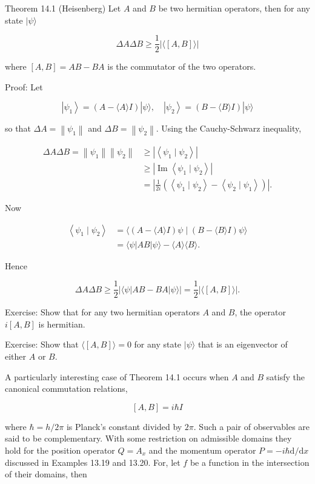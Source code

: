 \documentclass[10pt]{article}
\begin{document}
Theorem 14.1 (Heisenberg) Let $A$ and $B$ be two hermitian operators, then for any state $|\psi\rangle$

$$
\Delta A \Delta B \geq \frac{1}{2}|\langle[A, B]\rangle|
$$

where $[A, B]=A B-B A$ is the commutator of the two operators.

Proof: Let

$$
\left|\psi_{1}\right\rangle=(A-\langle A\rangle I)|\psi\rangle, \quad\left|\psi_{2}\right\rangle=(B-\langle B\rangle I)|\psi\rangle
$$

so that $\Delta A=\left\|\psi_{1}\right\|$ and $\Delta B=\left\|\psi_{2}\right\|$. Using the Cauchy-Schwarz inequality,

$$
\begin{aligned}
\Delta A \Delta B=\left\|\psi_{1}\right\|\left\|\psi_{2}\right\| & \geq\left|\left\langle\psi_{1} \mid \psi_{2}\right\rangle\right| \\
& \geq\left|\operatorname{Im}\left\langle\psi_{1} \mid \psi_{2}\right\rangle\right| \\
& =\left|\frac{1}{2 i}\left(\left\langle\psi_{1} \mid \psi_{2}\right\rangle-\left\langle\psi_{2} \mid \psi_{1}\right\rangle\right)\right| .
\end{aligned}
$$

Now

$$
\begin{aligned}
\left\langle\psi_{1} \mid \psi_{2}\right\rangle & =\langle(A-\langle A\rangle I) \psi \mid(B-\langle B\rangle I) \psi\rangle \\
& =\langle\psi|A B| \psi\rangle-\langle A\rangle\langle B\rangle .
\end{aligned}
$$

Hence

$$
\Delta A \Delta B \geq \frac{1}{2}|\langle\psi|A B-B A| \psi\rangle|=\frac{1}{2}|\langle[A, B]\rangle| .
$$

Exercise: Show that for any two hermitian operators $A$ and $B$, the operator $i[A, B]$ is hermitian.

Exercise: Show that $\langle[A, B]\rangle=0$ for any state $|\psi\rangle$ that is an eigenvector of either $A$ or $B$.

A particularly interesting case of Theorem 14.1 occurs when $A$ and $B$ satisfy the canonical commutation relations,

$$
[A, B]=i \hbar I
$$

where $\hbar=h / 2 \pi$ is Planck's constant divided by $2 \pi$. Such a pair of observables are said to be complementary. With some restriction on admissible domains they hold for the position operator $Q=A_{x}$ and the momentum operator $P=-i \hbar \mathrm{d} / \mathrm{d} x$ discussed in Examples 13.19 and 13.20. For, let $f$ be a function in the intersection of their domains, then
\end{document}
